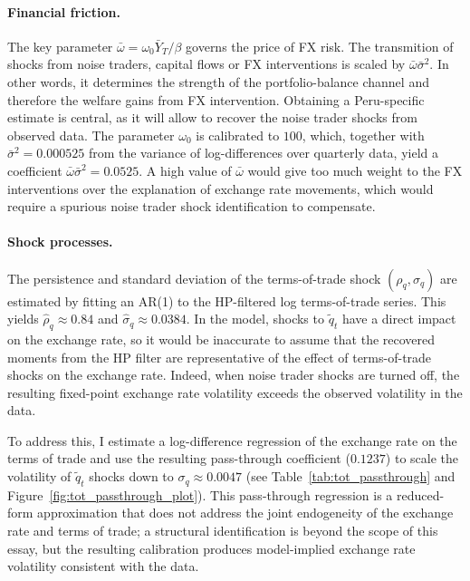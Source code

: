 \documentclass[12pt,a4paper]{article}
\begin{document}
\paragraph{Financial friction.} The key parameter $\bar{\omega} = \omega_0 \bar{Y}_T / \beta$ governs the price of FX risk. The transmition of shocks from noise traders, capital flows or FX interventions is scaled by $\bar{\omega} \bar{\sigma}^2$. In other words, it determines the strength of the portfolio-balance channel and therefore the welfare gains from FX intervention. Obtaining a Peru-specific estimate is central, as it will allow to recover the noise trader shocks from observed data. The parameter $\omega_0$ is calibrated to $100$, which, together with $\bar{\sigma}^2 = 0.000525$ from the variance of log-differences over quarterly data, yield a coefficient $\bar{\omega} \bar{\sigma}^2 = 0.0525$. A high value of $\bar{\omega}$ would give too much weight to the FX interventions over the explanation of exchange rate movements, which would require a spurious noise trader shock identification to compensate.

\paragraph{Shock processes.} The persistence and standard deviation of the terms-of-trade shock $(\rho_q, \sigma_q)$ are estimated by fitting an AR(1) to the HP-filtered log terms-of-trade series. This yields $\hat{\rho}_q \approx 0.84$ and $\hat{\sigma}_q \approx 0.0384$. In the model, shocks to $\tilde{q}_t$ have a direct impact on the exchange rate, so it would be inaccurate to assume that the recovered moments from the HP filter are representative of the effect of terms-of-trade shocks on the exchange rate. Indeed, when noise trader shocks are turned off, the resulting fixed-point exchange rate volatility exceeds the observed volatility in the data. 

To address this, I estimate a log-difference regression of the exchange rate on the terms of trade and use the resulting pass-through coefficient ($0.1237$) to scale the volatility of $\tilde{q}_t$ shocks down to $\sigma_q \approx 0.0047$ (see Table~\ref{tab:tot_passthrough} and Figure~\ref{fig:tot_passthrough_plot}). This pass-through regression is a reduced-form approximation that does not address the joint endogeneity of the exchange rate and terms of trade; a structural identification is beyond the scope of this essay, but the resulting calibration produces model-implied exchange rate volatility consistent with the data.
\end{document}
